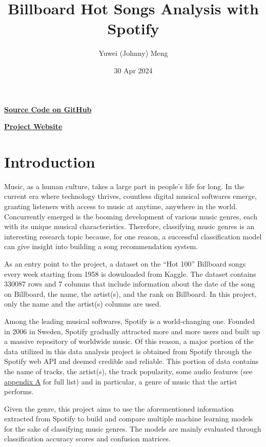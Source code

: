 \documentclass{article}
\title{Billboard Hot Songs Analysis with Spotify}
\author{Yuwei (Johnny) Meng}
\date{30 Apr 2024}
\begin{document}
\pagestyle{fancy}

\maketitle

\href{https://github.com/BullDF/billboard-songs-analysis-with-spotify/tree/main}{\textbf{Source Code on GitHub}}

\href{https://bulldf.github.io/billboard-songs-analysis-with-spotify/}{\textbf{Project Website}}

\section{Introduction}

Music, as a human culture, takes a large part in people's life for long. In the current era where technology thrives, countless digital musical softwares emerge, granting listeners with access to music at anytime, anywhere in the world. Concurrently emerged is the booming development of various music genres, each with its unique musical characteristics. Therefore, classifying music genres is an interesting research topic because, for one reason, a successful classification model can give insight into building a song recommendation system.

As an entry point to the project, a dataset on the ``Hot 100'' Billboard songs every week starting from 1958 is downloaded from Kaggle. The dataset contains 330087 rows and 7 columns that include information about the date of the song on Billboard, the name, the artist(s), and the rank on Billboard. In this project, only the name and the artist(s) columns are used.

Among the leading musical softwares, Spotify is a world-changing one. Founded in 2006 in Sweden, Spotify gradually attracted more and more users and built up a massive repository of worldwide music. Of this reason, a major portion of the data utilized in this data analysis project is obtained from Spotify through the Spotify web API and deemed credible and reliable. This portion of data contains the name of tracks, the artist(s), the track popularity, some audio features (see \hyperref[sec:appendixA]{appendix A} for full list) and in particular, a genre of music that the artist performs.

Given the genre, this project aims to use the aforementioned information extracted from Spotify to build and compare multiple machine learning models for the sake of classifying music genres. The models are mainly evaluated through classification accuracy scores and confusion matrices.
\end{document}
